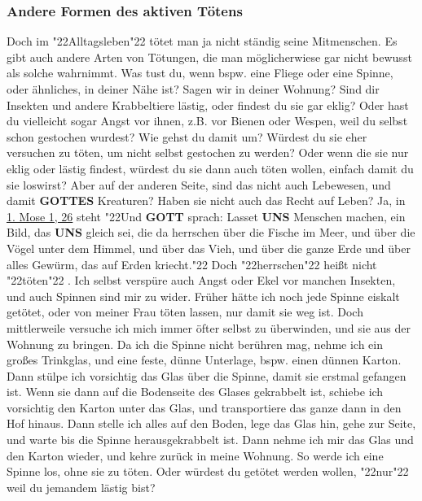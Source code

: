 \documentclass[10pt,a5paper]{article}
\newcommand{\Gottes}[0]{\textbf{GOTTES}}
\newcommand{\Gott}[0]{\textbf{GOTT}}
\newcommand{\Uns}[0]{\textbf{UNS}}
\newcommand{\q}[1]{\char"22{#1}\char"22 }
\begin{document}
	\subsubsection{Andere Formen des aktiven T\"otens}
		Doch im \q{Alltagsleben} t\"otet man ja nicht st\"andig seine Mitmenschen.
		Es gibt auch andere Arten von T\"otungen,
		die man m\"oglicherwiese gar nicht bewusst als solche wahrnimmt.
		Was tust du,
		wenn bspw. eine Fliege oder eine Spinne,
		oder \"ahnliches,
		in deiner N\"ahe ist?
		Sagen wir in deiner Wohnung?
		Sind dir Insekten und andere Krabbeltiere l\"astig,
		oder findest du sie gar eklig?
		Oder hast du vielleicht sogar Angst vor ihnen,
		z.B. vor Bienen oder Wespen,
		weil du selbst schon gestochen wurdest?
		Wie gehst du damit um?
		W\"urdest du sie eher versuchen zu t\"oten,
		um nicht selbst gestochen zu werden?
		Oder wenn die sie nur eklig oder l\"astig findest,
		w\"urdest du sie dann auch t\"oten wollen,
		einfach damit du sie loswirst?
		Aber auf der anderen Seite,
		sind das nicht auch Lebewesen,
		und damit {\Gottes} Kreaturen?
		Haben sie nicht auch das Recht auf Leben?
		Ja,
		in \href{https://www.die-bibel.de/bibeln/online-bibeln/lesen/LU17/GEN.1/1.-Mose-1}
		{1. Mose 1, 26} steht \q{Und {\Gott} sprach:
		Lasset {\Uns} Menschen machen,
		ein Bild,
		das {\Uns} gleich sei,
		die da herrschen \"uber die Fische im Meer,
		und \"uber die V\"ogel unter dem Himmel,
		und \"uber das Vieh,
		und \"uber die ganze Erde und über alles Gew\"urm,
		das auf Erden kriecht.}
		Doch \q{herrschen} hei{\ss}t nicht \q{t\"oten}.
		Ich selbst versp\"ure auch Angst oder Ekel vor manchen Insekten,
		und auch Spinnen sind mir zu wider.
		Fr\"uher h\"atte ich noch jede Spinne eiskalt get\"otet,
		oder von meiner Frau t\"oten lassen,
		nur damit sie weg ist.
		Doch mittlerweile versuche ich mich immer \"ofter selbst zu \"uberwinden,
		und sie aus der Wohnung zu bringen.
		Da ich die Spinne nicht ber\"uhren mag,
		nehme ich ein gro{\ss}es Trinkglas,
		und eine feste,
		d\"unne Unterlage,
		bspw. einen d\"unnen Karton.
		Dann st\"ulpe ich vorsichtig das Glas \"uber die Spinne,
		damit sie erstmal gefangen ist.
		Wenn sie dann auf die Bodenseite des Glases gekrabbelt ist,
		schiebe ich vorsichtig den Karton unter das Glas,
		und transportiere das ganze dann in den Hof hinaus.
		Dann stelle ich alles auf den Boden,
		lege das Glas hin,
		gehe zur Seite,
		und warte bis die Spinne herausgekrabbelt ist.
		Dann nehme ich mir das Glas und den Karton wieder,
		und kehre zur\"uck in meine Wohnung.
		So werde ich eine Spinne los,
		ohne sie zu t\"oten.
		Oder w\"urdest du get\"otet werden wollen,
		\q{nur} weil du jemandem l\"astig bist?
\end{document}
